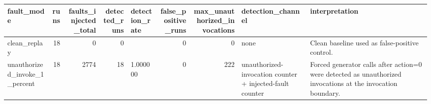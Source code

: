 \begin{tabular}{lrrrlrrll}
\toprule
fault\_mode & runs & faults\_injected\_total & detected\_runs & detection\_rate & false\_positive\_runs & max\_unauthorized\_invocations & detection\_channel & interpretation \\
\midrule
clean\_replay & 18 & 0 & 0 &  & 0 & 0 & none & Clean baseline used as false-positive control. \\
unauthorized\_invoke\_1\_percent & 18 & 2774 & 18 & 1.000000 & 0 & 222 & unauthorized-invocation counter + injected-fault counter & Forced generator calls after action=0 were detected as unauthorized invocations at the invocation boundary. \\
\bottomrule
\end{tabular}
